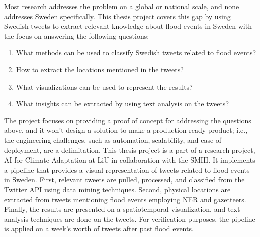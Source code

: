 Most research addresses the problem on a global or national scale, and none addresses Sweden
specifically. This thesis project covers this gap by using Swedish tweets to extract relevant
knowledge about flood events in Sweden with the focus on answering the following questions:
\begin{enumerate} 
  \item What methods can be used to classify Swedish tweets related to flood events?
  \item How to extract the locations mentioned in the tweets? 
  \item What visualizations can be used to represent the results? 
  \item What insights can be extracted by using text analysis on the tweets?
\end{enumerate}

The project focuses on providing a proof of concept for addressing the questions above, and it won't
design a solution to make a production-ready product; i.e., the engineering challenges, such as
automation, scalability, and ease of deployment, are a delimitation. This thesis project is a part
of a research project, AI for Climate Adaptation \cite{nesetAI4ClimateAdaptation} at \ac{LiU} in
collaboration with the \ac{SMHI}. It implements a pipeline that provides a visual representation of
tweets related to flood events in Sweden. First, relevant tweets are pulled, processed, and
classified from the Twitter API using data mining techniques. Second, physical locations are
extracted from tweets mentioning flood events employing \ac{NER} and gazetteers. Finally, the
results are presented on a spatiotemporal visualization, and text analysis techniques are done on
the tweets. For verification purposes, the pipeline is applied on a week's worth of tweets after
past flood events.

